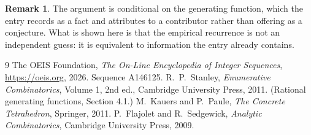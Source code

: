\documentclass[11pt,a4paper]{article}
\theoremstyle{plain}
\theoremstyle{definition}
\newtheorem{remark}[theorem]{Remark}
\begin{document}
\begin{remark}
The argument is conditional on the generating function, which the entry records as a fact and
attributes to a contributor rather than offering as a conjecture. What is shown here is that
the empirical recurrence is not an independent guess: it is equivalent to information the
entry already contains.
\end{remark}

\begin{thebibliography}{9}
 The OEIS Foundation, \emph{The On-Line Encyclopedia of Integer
Sequences}, \url{https://oeis.org}, 2026. Sequence A146125.
 R.~P.~Stanley, \emph{Enumerative Combinatorics}, Volume 1, 2nd ed.,
Cambridge University Press, 2011. (Rational generating functions, Section 4.1.)
 M.~Kauers and P.~Paule, \emph{The Concrete Tetrahedron}, Springer, 2011.
 P.~Flajolet and R.~Sedgewick, \emph{Analytic Combinatorics}, Cambridge
University Press, 2009.
\end{thebibliography}
\end{document}

